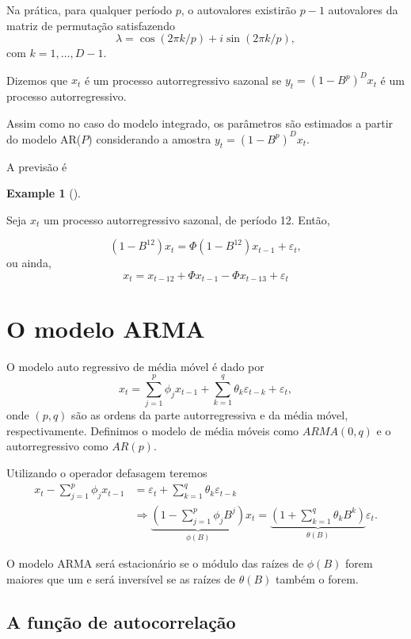 \documentclass[
  letterpaper,
  DIV=11,
  numbers=noendperiod]{scrartcl}
\theoremstyle{definition}
\newtheorem{example}{Example}[chapter]
\theoremstyle{definition}
\theoremstyle{plain}
\theoremstyle{plain}
\theoremstyle{remark}
\begin{document}
Na prática, para qualquer período \(p\), o autovalores existirão \(p-1\)
autovalores da matriz de permutação satisfazendo
\[\lambda= \cos(2\pi k/p)+i\sin(2\pi k/p),\] com \(k=1,\ldots,D-1\).

Dizemos que \(x_t\) é um processo autorregressivo sazonal se
\(y_t=(1-B^p)^Dx_t\) é um processo autorregressivo.

Assim como no caso do modelo integrado, os parâmetros são estimados a
partir do modelo AR(\(P\)) considerando a amostra
\(y_t=(1-B^{p})^Dx_t\).

A previsão é

\begin{example}[]\protect\hypertarget{exm-}{}\label{exm-}

Seja \(x_t\) um processo autorregressivo sazonal, de período 12. Então,

\[(1-B^{12})x_t=\Phi(1-B^{12})x_{t-1}+\varepsilon_t,\] ou ainda,
\[x_t=x_{t-12}+\Phi x_{t-1}-\Phi x_{t-13}+\varepsilon_t\]

\end{example}

\section{O modelo ARMA}\label{o-modelo-arma}

O modelo auto regressivo de média móvel é dado por
\[  x_t= \sum_{j=1}^p \phi_j x_{t-1}  + \sum_{k=1}^{q}\theta_k\varepsilon_{t-k}+ \varepsilon_t,
\] onde \((p,q)\) são as ordens da parte autorregressiva e da média
móvel, respectivamente. Definimos o modelo de média móveis como
\(ARMA(0,q)\) e o autorregressivo como \(AR(p).\)

Utilizando o operador defasagem teremos \begin{align}
        x_t-\sum_{j=1}^p \phi_j x_{t-1}&= \varepsilon_t + \sum_{k=1}^{q}\theta_k\varepsilon_{t-k} \\
        &\Rightarrow 
        \underbrace{\left(1-\sum_{j=1}^p \phi_j B^j\right)}_{\phi(B)}x_{t} =  \underbrace{\left(1+\sum_{k=1}^{q}\theta_kB^k\right)}_{\theta(B)}\varepsilon_{t}.
        \end{align}

O modelo ARMA será estacionário se o módulo das raízes de \(\phi(B)\)
forem maiores que um e será inversível se as raízes de \(\theta(B)\)
também o forem.

\subsection{A função de
autocorrelação}\label{a-funuxe7uxe3o-de-autocorrelauxe7uxe3o-1}
\end{document}
